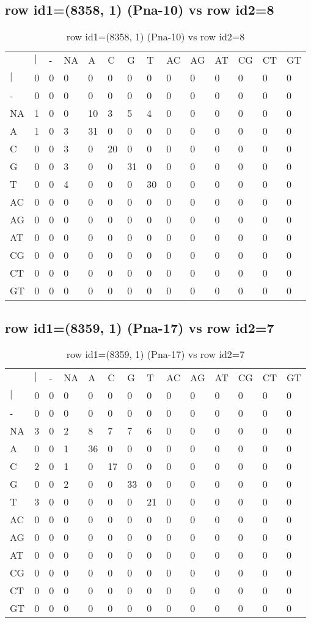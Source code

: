 \subsection{row id1=(8358, 1) (Pna-10) vs row id2=8}
\begin{center}
\begin{longtable}{|l|l|l|l|l|l|l|l|l|l|l|l|l|l|}
\caption{row id1=(8358, 1) (Pna-10) vs row id2=8} \label{table_dm388}\\
\hline
\\
\hline
&$|$&-&NA&A&C&G&T&AC&AG&AT&CG&CT&GT\\
$|$&0&0&0&0&0&0&0&0&0&0&0&0&0\\
-&0&0&0&0&0&0&0&0&0&0&0&0&0\\
NA&1&0&0&10&3&5&4&0&0&0&0&0&0\\
A&1&0&3&31&0&0&0&0&0&0&0&0&0\\
C&0&0&3&0&20&0&0&0&0&0&0&0&0\\
G&0&0&3&0&0&31&0&0&0&0&0&0&0\\
T&0&0&4&0&0&0&30&0&0&0&0&0&0\\
AC&0&0&0&0&0&0&0&0&0&0&0&0&0\\
AG&0&0&0&0&0&0&0&0&0&0&0&0&0\\
AT&0&0&0&0&0&0&0&0&0&0&0&0&0\\
CG&0&0&0&0&0&0&0&0&0&0&0&0&0\\
CT&0&0&0&0&0&0&0&0&0&0&0&0&0\\
GT&0&0&0&0&0&0&0&0&0&0&0&0&0\\
\hline
\end{longtable}
\end{center}

\subsection{row id1=(8359, 1) (Pna-17) vs row id2=7}
\begin{center}
\begin{longtable}{|l|l|l|l|l|l|l|l|l|l|l|l|l|l|}
\caption{row id1=(8359, 1) (Pna-17) vs row id2=7} \label{table_dm390}\\
\hline
\\
\hline
&$|$&-&NA&A&C&G&T&AC&AG&AT&CG&CT&GT\\
$|$&0&0&0&0&0&0&0&0&0&0&0&0&0\\
-&0&0&0&0&0&0&0&0&0&0&0&0&0\\
NA&3&0&2&8&7&7&6&0&0&0&0&0&0\\
A&0&0&1&36&0&0&0&0&0&0&0&0&0\\
C&2&0&1&0&17&0&0&0&0&0&0&0&0\\
G&0&0&2&0&0&33&0&0&0&0&0&0&0\\
T&3&0&0&0&0&0&21&0&0&0&0&0&0\\
AC&0&0&0&0&0&0&0&0&0&0&0&0&0\\
AG&0&0&0&0&0&0&0&0&0&0&0&0&0\\
AT&0&0&0&0&0&0&0&0&0&0&0&0&0\\
CG&0&0&0&0&0&0&0&0&0&0&0&0&0\\
CT&0&0&0&0&0&0&0&0&0&0&0&0&0\\
GT&0&0&0&0&0&0&0&0&0&0&0&0&0\\
\hline
\end{longtable}
\end{center}

